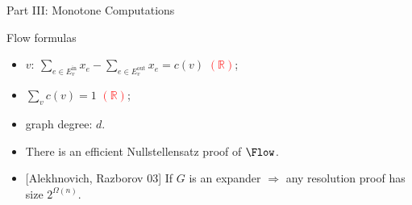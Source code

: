 \begin{frame}

    \begin{center}
        \Huge Part III: Monotone Computations
    \end{center}
    
\end{frame}

\begin{frame}{Flow formulas}
    \begin{minipage}{0.5 \linewidth}
        
    \end{minipage}%
    \begin{minipage}{0.5 \linewidth}
        \pause
        \pause
        \begin{itemize}
            \item $v\colon ~ \sum\limits_{e \in E^{\mathrm{in}}_v} x_{e} -
                \sum\limits_{e \in E^{\mathrm{out}}_v} x_{e} = c(v)$ 
                \textcolor{red}{$(\mathbb{R})$};
            \item $\sum\limits_{v} c(v) = 1$ \textcolor{red}{$(\mathbb{R})$};
            \item graph degree: $d$.
        \end{itemize}
    \end{minipage}

    \pause
    \vspace{0.2cm}
    \begin{itemize}
        \item{} There is an efficient Nullstellensatz proof of $\Flow$.
        \item{} [Alekhnovich, Razborov 03] If $G$ is an expander $\Rightarrow$ any
            resolution proof has size $2^{\Omega(n)}$.
    \end{itemize}


\end{frame}
